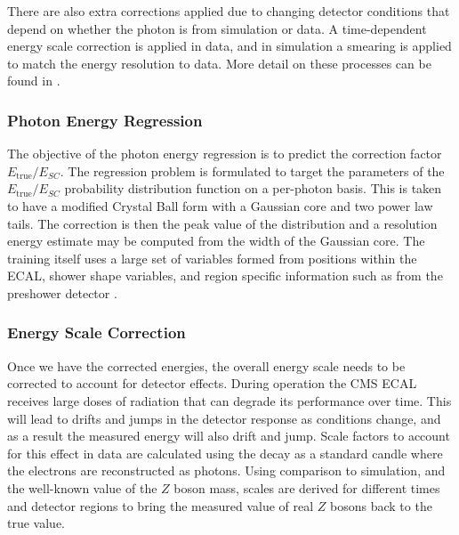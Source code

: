 There are also extra corrections applied due to changing detector conditions that depend on whether the photon is from simulation or data. A time-dependent energy scale correction is applied in data, and in simulation a smearing is applied to match the energy resolution to data. 
More detail on these processes can be found in \cite{PhotonReco}.

\subsubsection{Photon Energy Regression}
The objective of the photon energy regression is to predict the correction factor $E_{\mathrm{true}}/E_{SC}$. 
The regression problem is formulated to target the parameters of the $E_{\mathrm{true}}/E_{SC}$ probability distribution function on a per-photon basis. 
This is taken to have a modified Crystal Ball form with a Gaussian core and two power law tails. 
The correction is then the peak value of the distribution and a resolution energy estimate may be computed from the width of the Gaussian core. 
The training itself uses a large set of variables formed from positions within the ECAL, shower shape variables, and region specific information such as from the preshower detector \cite{CMSHiggsPhotonReco}.


\subsubsection{Energy Scale Correction}
Once we have the corrected energies, the overall energy scale needs to be corrected to account for detector effects. 
During operation the CMS ECAL receives large doses of radiation that can degrade its performance over time. 
This will lead to drifts and jumps in the detector response as conditions change, and as a result the measured energy will also drift and jump. 
Scale factors to account for this effect in data are calculated using the \Zee decay as a standard candle where the electrons are reconstructed as photons. 
Using comparison to simulation, and the well-known value of the $Z$ boson mass, scales are derived for different times and detector regions to bring the measured value of real $Z$ bosons back to the true value. 

